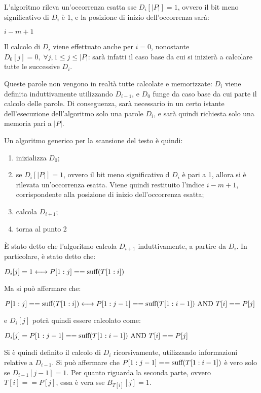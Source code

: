 L'algoritmo rileva un'occorrenza esatta sse $D_i[|P|] = 1$, ovvero il bit meno significativo di $D_i$ è 1, e la posizione di inizio dell'occorrenza sarà:
\begin{center}
    $i-m+1$
\end{center}
Il calcolo di $D_i$ viene effettuato anche per $i=0$, nonostante $D_0[j] = 0, \; \forall j, 1 \le j \le |P|$: sarà infatti il caso base da cui si inizierà a calcolare tutte le successive $D_i.$

Queste parole non vengono in realtà tutte calcolate e memorizzate: $D_i$ viene definita induttivamente utilizzando $D_{i-1}$, e $D_0$ funge da caso base da cui parte il calcolo delle parole. Di conseguenza, sarà necessario in un certo istante dell'esecuzione dell'algoritmo solo una parole $D_i$, e sarà quindi richiesta solo una memoria pari a $|P|$.

Un algoritmo generico per la scansione del testo è quindi:
\begin{enumerate}
    \item inizializza $D_0$;
    \item se $D_i[|P|] = 1$, ovvero il bit meno significativo d $D_i$ è pari a 1, allora si è rilevata un'occorrenza esatta. Viene quindi restituito l'indice $i-m+1$, corrispondente alla posizione di inizio dell'occorrenza esatta;
    \item calcola $D_{i+1}$;
    \item torna al punto 2
\end{enumerate}

È stato detto che l'algoritmo calcola $D_{i+1}$ induttivamente, a partire da $D_i$. In particolare, è stato detto che:
\begin{center}
    $D_i[j] = 1 \longleftrightarrow P[1:j] == \textnormal{suff}(T[1:i])$
\end{center} 
Ma si può affermare che:
\begin{center}
    $P[1:j] == \textnormal{suff}(T[1:i]) \longleftrightarrow P[1:j-1] == \textnormal{suff}(T[1:i-1]) \textnormal{ AND } T[i] == P[j]$
\end{center}
e $D_i[j]$ potrà quindi essere calcolato come:
\begin{center}
    $D_i[j] = P[1:j-1] == \textnormal{suff}(T[1:i-1]) \textnormal{ AND } T[i] == P[j]$
\end{center}
Si è quindi definito il calcolo di $D_i$ ricorsivamente, utilizzando informazioni relative a $D_{i-1}$. Si può affermare che $P[1:j-1] == \textnormal{suff}(T[1:i-1])$ è vero solo se $D_{i-1}[j-1] = 1$.
Per quanto riguarda la seconda parte, ovvero $T[i] == P[j]$, essa è vera sse $B_{T[i]}[j] = 1$.

